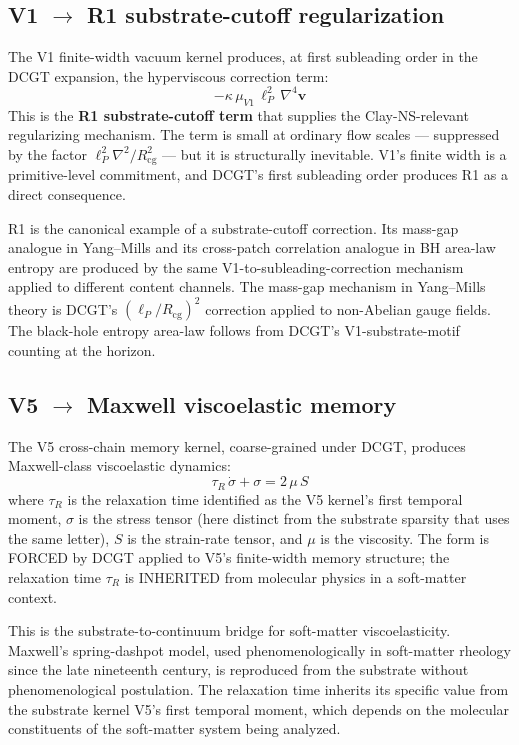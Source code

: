 \documentclass[11pt,a4paper]{article}
\begin{document}
\subsection{V1 $\to$ R1 substrate-cutoff regularization}

The V1 finite-width vacuum kernel produces, at first subleading order in the DCGT expansion, the hyperviscous correction term:
\[
-\kappa\, \mu_{V1}\, \ell_P^{2}\, \nabla^{4} \mathbf{v}
\]
This is the \textbf{R1 substrate-cutoff term} that supplies the Clay-NS-relevant regularizing mechanism. The term is small at ordinary flow scales --- suppressed by the factor $\ell_P^2 \nabla^2 / R_{\mathrm{cg}}^2$ --- but it is structurally inevitable. V1's finite width is a primitive-level commitment, and DCGT's first subleading order produces R1 as a direct consequence.

R1 is the canonical example of a substrate-cutoff correction. Its mass-gap analogue in Yang--Mills and its cross-patch correlation analogue in BH area-law entropy are produced by the same V1-to-subleading-correction mechanism applied to different content channels. The mass-gap mechanism in Yang--Mills theory is DCGT's $(\ell_P/R_{\mathrm{cg}})^2$ correction applied to non-Abelian gauge fields. The black-hole entropy area-law follows from DCGT's V1-substrate-motif counting at the horizon.

\subsection{V5 $\to$ Maxwell viscoelastic memory}

The V5 cross-chain memory kernel, coarse-grained under DCGT, produces Maxwell-class viscoelastic dynamics:
\[
\tau_R\, \dot\sigma + \sigma = 2\, \mu\, S
\]
where $\tau_R$ is the relaxation time identified as the V5 kernel's first temporal moment, $\sigma$ is the stress tensor (here distinct from the substrate sparsity that uses the same letter), $S$ is the strain-rate tensor, and $\mu$ is the viscosity. The form is FORCED by DCGT applied to V5's finite-width memory structure; the relaxation time $\tau_R$ is INHERITED from molecular physics in a soft-matter context.

This is the substrate-to-continuum bridge for soft-matter viscoelasticity. Maxwell's spring-dashpot model, used phenomenologically in soft-matter rheology since the late nineteenth century, is reproduced from the substrate without phenomenological postulation. The relaxation time inherits its specific value from the substrate kernel V5's first temporal moment, which depends on the molecular constituents of the soft-matter system being analyzed.
\end{document}
